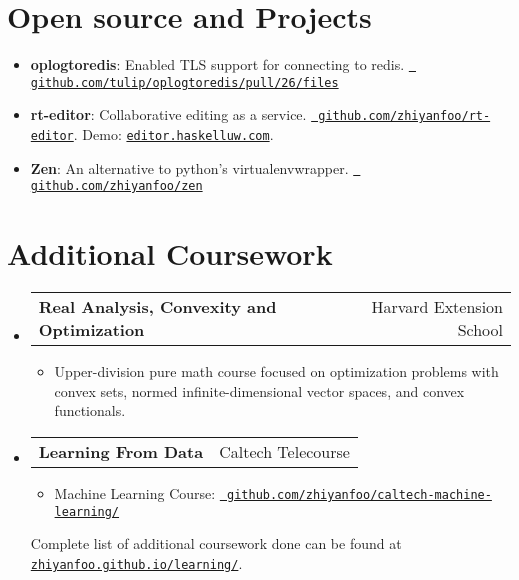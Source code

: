 \documentclass[letterpaper,11pt]{article}
\makeatletter
\newcommand{\resumeItem}[2]{
  \item\small{
    \textbf{#1}{: #2 \vspace{-2pt}}
  }
}
\newcommand{\resumeSubheading}[4]{
  \vspace{-1pt}\item
    \begin{tabular*}{0.97\textwidth}{l@{\extracolsep{\fill}}r}
      \textbf{#1} & #2 \\
      \textit{\small#3} & \textit{\small #4} \\
    \end{tabular*}\vspace{-5pt}
}
\newcommand{\courseSubheading}[2]{
  \vspace{-1pt}\item
    \begin{tabular*}{0.97\textwidth}{l@{\extracolsep{\fill}}r}
      \textbf{#1} & #2 \\
    \end{tabular*}\vspace{-5pt}
}
\newcommand{\courseItem}[1]{
  \item\small{
    {#1 \vspace{-2pt}}
  }
}
\newcommand{\resumeSubItem}[2]{\resumeItem{#1}{#2}\vspace{-4pt}}
\newcommand{\resumeSubHeadingListStart}{\begin{itemize}[leftmargin=*, label={}]}
\newcommand{\resumeSubHeadingListEnd}{\end{itemize}}
\newcommand{\resumeItemListStart}{\begin{itemize}[label={}]}
\newcommand{\resumeItemListEnd}{\end{itemize}\vspace{-5pt}}
\makeatother
\begin{document}
\section{Open source and Projects}
  \resumeSubHeadingListStart
    \resumeSubItem{oplogtoredis}
      {Enabled TLS support for connecting to redis.
            \href{https://github.com/tulip/oplogtoredis/pull/26/files}{\tt
            github.com/tulip/oplogtoredis/pull/26/files}
      }
    \resumeSubItem{rt-editor}
      {Collaborative editing as a service. \href{https://github.com/zhiyanfoo/rt-editor}{\tt
      github.com/zhiyanfoo/rt-editor}.
        Demo: \href{http://editor.haskelluw.com}{\tt editor.haskelluw.com}.
      }
    \resumeSubItem{Zen}
      {An alternative to python's virtualenvwrapper.
            \href{https://github.com/zhiyanfoo/zen}{\tt
            github.com/zhiyanfoo/zen}
      }
  \resumeSubHeadingListEnd

\section{Additional Coursework}
 \resumeSubHeadingListStart
    \courseSubheading
      {Real Analysis, Convexity and Optimization}{Harvard Extension School}
      \resumeItemListStart
        \courseItem
          {Upper-division pure math course focused on optimization problems
            with convex sets, normed infinite-dimensional vector spaces, and
            convex functionals.}
      \resumeItemListEnd
    \courseSubheading
      {Learning From Data}{Caltech Telecourse}
      \resumeItemListStart
        \courseItem {Machine Learning Course:
    \href{https://github.com/zhiyanfoo/caltech-machine-learning/}{\tt
    github.com/zhiyanfoo/caltech-machine-learning/}}
      \resumeItemListEnd
\vspace{5pt}
 Complete list of additional coursework done can be found at
\href{https://zhiyanfoo.github.io/learning/}{\tt zhiyanfoo.github.io/learning/}.
 \resumeSubHeadingListEnd




\end{document}
